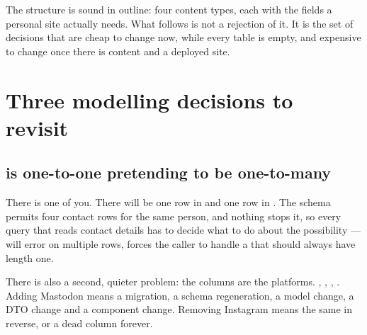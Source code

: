 \begin{diagram}
\end{diagram}

The structure is sound in outline: four content types, each with the fields a personal site
actually needs. What follows is not a rejection of it. It is the set of decisions that are cheap to
change now, while every table is empty, and expensive to change once there is content and a
deployed site.

\section{Three modelling decisions to revisit}

\subsection{ is one-to-one pretending to be one-to-many}

There is one of you. There will be one row in  and one row in
. The schema permits four contact rows for the same person, and
nothing stops it, so every query that reads contact details has to decide what to do about the
possibility ---  will error on multiple rows,  forces the
caller to handle a  that should always have length one.

There is also a second, quieter problem: the columns are the platforms. ,
, , . Adding Mastodon means a migration, a schema
regeneration, a model change, a DTO change and a component change. Removing Instagram means the
same in reverse, or a dead column forever.

